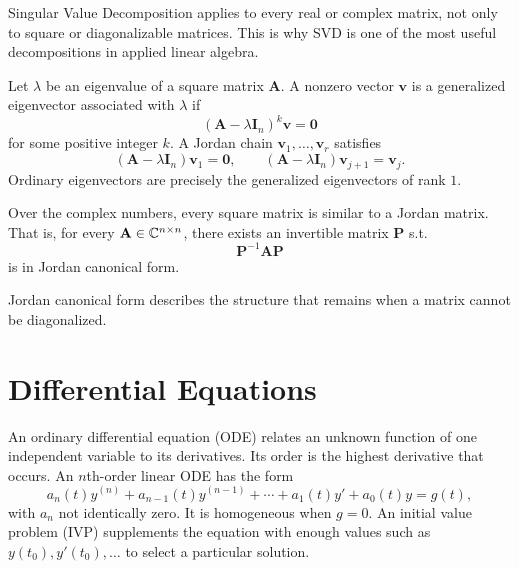     \begin{remark}
        Singular Value Decomposition applies to every real or complex matrix,
        not only to square or diagonalizable matrices. This is why SVD is one
        of the most useful decompositions in applied linear algebra.
    \end{remark}


    \begin{definition}
        Let $\lambda$ be an eigenvalue of a square matrix $\mathbf{A}$. A
        nonzero vector $\mathbf{v}$ is a generalized eigenvector associated
        with $\lambda$ if
        \[
            (\mathbf{A}-\lambda\mathbf{I}_n)^k\mathbf{v}
            =
            \mathbf{0}
        \]
        for some positive integer $k$. A Jordan chain
        $\mathbf{v}_1,\dots,\mathbf{v}_r$ satisfies
        \[
            (\mathbf{A}-\lambda\mathbf{I}_n)\mathbf{v}_1=\mathbf{0},
            \qquad
            (\mathbf{A}-\lambda\mathbf{I}_n)\mathbf{v}_{j+1}
            =
            \mathbf{v}_j.
        \]
        Ordinary eigenvectors are precisely the generalized eigenvectors of
        rank $1$.
    \end{definition}

    \begin{theorem}
        Over the complex numbers, every square matrix is similar to a Jordan
        matrix. That is, for every $\mathbf{A}\in\mathbb{C}^{n\times n}$, there exists
        an invertible matrix $\mathbf{P}$ s.t.
        \[
            \mathbf{P}^{-1}\mathbf{A}\mathbf{P}
        \]
        is in Jordan canonical form.
    \end{theorem}

    \begin{remark}
        Jordan canonical form describes the structure that remains when a matrix
        cannot be diagonalized.
    \end{remark}

    \chapter{Differential Equations}



    \begin{definition}
        An ordinary differential equation (ODE) relates an unknown function of
        one independent variable to its derivatives. Its order is the highest
        derivative that occurs. An $n$th-order linear ODE has the form
        \[
            a_n(t)y^{(n)}+a_{n-1}(t)y^{(n-1)}+\cdots+a_1(t)y'+a_0(t)y=g(t),
        \]
        with $a_n$ not identically zero. It is homogeneous when $g=0$.
        An initial value problem (IVP) supplements the equation with enough
        values such as $y(t_0),y'(t_0),\dots$ to select a particular solution.
    \end{definition}


